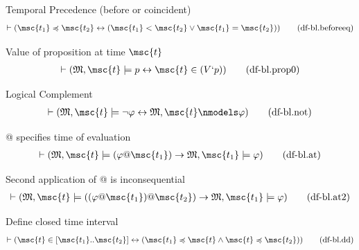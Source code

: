 \begin{metadefinition} Temporal Precedence (before or coincident)
\begin{align}
\vdash ( \msc{t_1} \preccurlyeq \msc{t_2} \leftrightarrow ( \msc{t_1} < \msc{t_2} \vee \msc{t_1} = \msc{t_2} ) )\label{eq:df-bl.beforeeq}\tag{df-bl.beforeeq}
\end{align}
\end{metadefinition}


\begin{metadefinition} Value of proposition at time $\msc{t}$
\begin{align}
\vdash ( \mathfrak{M} , \msc{t} \models p \leftrightarrow \msc{t} \in ( V ` p ) )\label{eq:df-bl.prop0}\tag{df-bl.prop0}
\end{align}
\end{metadefinition}


\begin{metadefinition} Logical Complement
\begin{align}
\vdash ( \mathfrak{M} , \msc{t} \models \lnot \varphi \leftrightarrow \mathfrak{M} , \msc{t} \nmodels \varphi )\label{eq:df-bl.not}\tag{df-bl.not}
\end{align}
\end{metadefinition}


\begin{metadefinition} @ specifies time of evaluation
\begin{align}
\vdash ( \mathfrak{M} , \msc{t} \models ( \varphi @ \msc{t_1} ) \rightarrow \mathfrak{M} , \msc{t_1} \models \varphi )\label{eq:df-bl.at}\tag{df-bl.at}
\end{align}
\end{metadefinition}


\begin{metadefinition} Second application of @ is inconsequential
\begin{align}
\vdash ( \mathfrak{M} , \msc{t} \models ( ( \varphi @ \msc{t_1} ) @ \msc{t_2} ) \rightarrow \mathfrak{M} , \msc{t_1} \models \varphi )\label{eq:df-bl.at2}\tag{df-bl.at2}
\end{align}
\end{metadefinition}


\begin{metadefinition} Define closed time interval
\begin{align}
\vdash ( \msc{t} \in [ \msc{t_1} .. \msc{t_2} ] \leftrightarrow ( \msc{t_1} \preccurlyeq \msc{t} \wedge \msc{t} \preccurlyeq \msc{t_2} ) )\label{eq:df-bl.dd}\tag{df-bl.dd}
\end{align}
\end{metadefinition}


